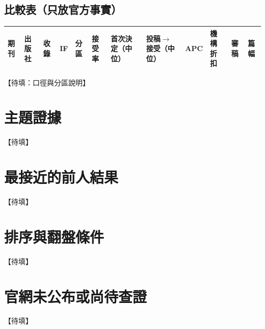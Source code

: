 \documentclass[11pt,a4paper]{article}
\begin{document}
\begin{landscape}
\section{比較表（只放官方事實）}\label{sec:table}
\footnotesize
\renewcommand{\arraystretch}{0.9}
\setlength{\tabcolsep}{2pt}
\begin{longtable}{@{}>{\raggedright\arraybackslash}p{3.4cm}>{\raggedright\arraybackslash}p{1.5cm}p{1.2cm}p{0.8cm}p{1.4cm}>{\raggedright\arraybackslash}p{2.1cm}>{\raggedright\arraybackslash}p{1.8cm}>{\raggedright\arraybackslash}p{3.2cm}>{\raggedright\arraybackslash}p{2.5cm}>{\raggedright\arraybackslash}p{2.4cm}>{\raggedright\arraybackslash}p{1.3cm}>{\raggedright\arraybackslash}p{1.7cm}@{}}
\toprule
期刊 & 出版社 & 收錄 & IF & 分區 & 接受率 & 首次決定（中位） & 投稿$\to$接受（中位） & APC & 機構折扣 & 審稿 & 篇幅 \\
\midrule
\endhead
\bottomrule
\end{longtable}
\end{landscape}

【待填：口徑與分區說明】

\section{主題證據}\label{sec:topic}
【待填】

\section{最接近的前人結果}\label{sec:prior}
【待填】

\section{排序與翻盤條件}\label{sec:order}
【待填】

\section{官網未公布或尚待查證}
【待填】
\end{document}
